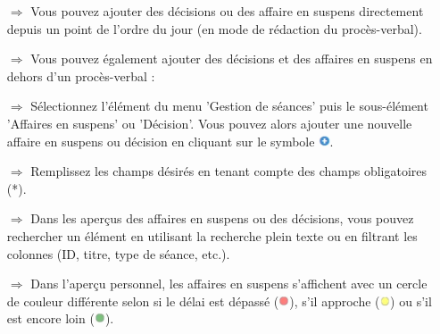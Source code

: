 \documentclass{article}
\begin{document}
\begin{multicols}{2}
\begin{tcolorbox}[colback=blue!5,colframe=blue!40!black,title=Listes d'affaires en suspens et de décisions]
\begin{itemize}
  \item[$\Longrightarrow$] Vous pouvez ajouter des décisions ou des affaire en suspens directement depuis un point de l'ordre du jour (en mode de rédaction du procès-verbal).
  \item[$\Longrightarrow$] Vous pouvez également ajouter des décisions et des affaires en suspens en dehors d'un procès-verbal : 
  \item[$\Longrightarrow$] Sélectionnez l'élément du menu 'Gestion de séances' puis le sous-élément 'Affaires en suspens' ou 'Décision'. Vous pouvez alors ajouter une nouvelle affaire en suspens ou décision en cliquant sur le symbole \includegraphics[height=9pt]{Icons/Plussymbol.jpg}.
  \item[$\Longrightarrow$] Remplissez les champs désirés en tenant compte des champs obligatoires (*). 
	\item[$\Longrightarrow$] Dans les aperçus des affaires en suspens ou des décisions, vous pouvez rechercher un élément en utilisant la recherche plein texte ou en filtrant les colonnes (ID, titre, type de séance, etc.).
	\item[$\Longrightarrow$] Dans l'aperçu personnel, les affaires en suspens s'affichent avec un cercle de couleur différente selon si le délai est dépassé (\includegraphics[height=9pt]{Icons/PunktRot.jpg}), s'il approche (\includegraphics[height=9pt]{Icons/PunktGelb.jpg}) ou s'il est encore loin (\includegraphics[height=9pt]{Icons/PunktGruen.jpg}).
\end{itemize}
\end{tcolorbox}


\end{multicols}


\end{document}
